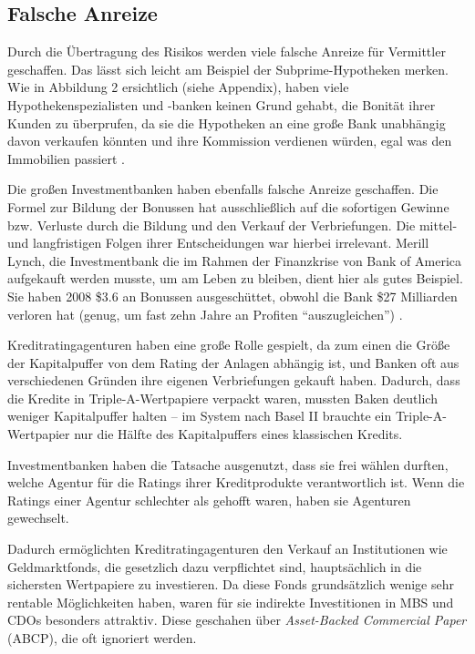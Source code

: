 \documentclass[a4paper,11pt]{report}
\begin{document}
\subsection{Falsche Anreize}
Durch die \"Ubertragung des Risikos werden
viele falsche Anreize f\"ur Vermittler geschaffen. 
Das l\"asst sich leicht am Beispiel der Subprime-Hypotheken merken.
Wie in Abbildung 2 ersichtlich (siehe Appendix), haben viele
Hypothekenspezialisten und -banken keinen Grund gehabt, die 
Bonit\"at ihrer Kunden zu \"uberprufen, da sie die Hypotheken
an eine große Bank unabh\"angig davon verkaufen k\"onnten
und ihre Kommission verdienen w\"urden, egal was den 
Immobilien passiert \parencite[565]{crottycam}.

Die großen Investmentbanken haben ebenfalls falsche Anreize geschaffen.
Die Formel zur Bildung der Bonussen hat ausschließlich auf die sofortigen
Gewinne bzw. Verluste durch die Bildung und den Verkauf der Verbriefungen.
Die mittel- und langfristigen Folgen ihrer Entscheidungen war hierbei irrelevant.
Merill Lynch, die Investmentbank die im Rahmen der Finanzkrise von
Bank of America aufgekauft werden musste, um am Leben zu bleiben,
dient hier als gutes Beispiel. Sie haben 2008 \$3.6 an Bonussen ausgesch\"uttet,
obwohl die Bank \$27 Milliarden verloren hat (genug, um fast zehn Jahre an Profiten
\enquote{auszugleichen}) \parencite[565]{crottycam}.

Kreditratingagenturen haben eine große Rolle gespielt, da zum einen
die Größe der Kapitalpuffer
von dem Rating der Anlagen abh\"angig ist, und Banken
oft aus verschiedenen Gr\"unden ihre eigenen Verbriefungen
gekauft haben. Dadurch, dass die Kredite in Triple-A-Wertpapiere
verpackt waren, mussten Baken deutlich weniger Kapitalpuffer halten
 -- im System nach Basel II brauchte ein Triple-A-Wertpapier
 nur die H\"alfte des Kapitalpuffers eines klassischen Kredits.

Investmentbanken haben die Tatsache ausgenutzt,
dass sie frei w\"ahlen durften, welche Agentur f\"ur die
Ratings ihrer Kreditprodukte verantwortlich ist. Wenn die Ratings
einer Agentur schlechter als gehofft waren, haben sie Agenturen
gewechselt.

Dadurch erm\"oglichten Kreditratingagenturen
den Verkauf an Institutionen wie Geldmarktfonds,
die gesetzlich dazu
verpflichtet sind, haupts\"achlich in die sichersten Wertpapiere
zu investieren. Da diese Fonds grunds\"atzlich
wenige sehr rentable M\"oglichkeiten haben,
waren f\"ur sie indirekte Investitionen in 
MBS und CDOs besonders attraktiv. Diese geschahen \"uber
\textit{Asset-Backed Commercial Paper} (ABCP), die oft ignoriert werden.
\end{document}
